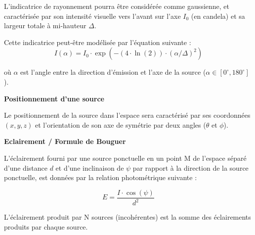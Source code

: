 \documentclass[10pt]{article} %
\begin{document}
\qquad

L'indicatrice de rayonnement pourra être considérée comme gaussienne, et caractérisée par son intensité visuelle vers l'avant sur l'axe $I_0$ (en candela) et sa largeur totale à mi-hauteur $\Delta$.

Cette indicatrice peut-être modélisée par l'équation suivante : $$I(\alpha) = I_0 \cdot \exp(-(4 \cdot \ln(2)) \cdot (\alpha/\Delta)^2)$$

où $\alpha$ est l'angle entre la direction d'émission et l'axe de la source ($\alpha \in [0^{\circ}, 180^{\circ}]$). 

\qquad 

\textbf{Positionnement d'une source}

Le positionnement de la source dans l'espace sera caractérisé par ses coordonnées $(x, y, z)$ et l'orientation de son axe de symétrie par deux angles ($\theta$ et $\phi$). 
	

\qquad 

\textbf{Eclairement / Formule de Bouguer}

L'éclairement fourni par une source ponctuelle en un point M de l'espace séparé d'une distance $d$ et d'une inclinaison de $\psi$ par rapport à la direction de la source ponctuelle, est données par la relation photométrique suivante : 

$$E = \frac{I \cdot \cos(\psi)}{d^2}$$

\qquad 

L'éclairement produit par N sources (incohérentes) est la somme des éclairements produits par chaque source.
\end{document}
